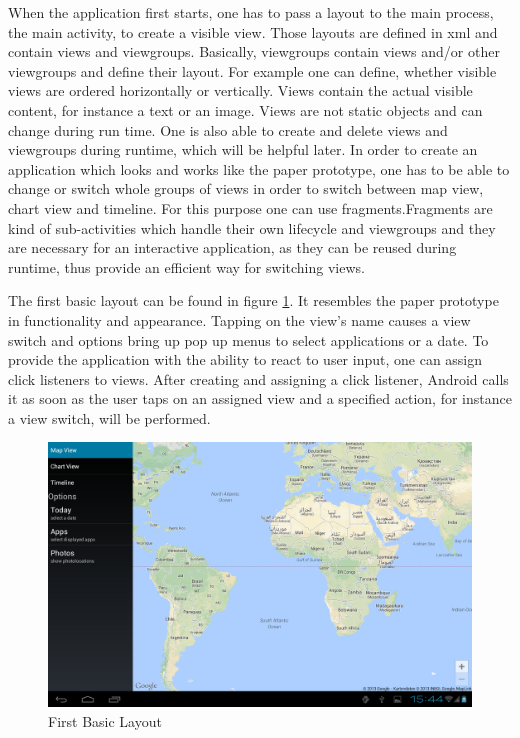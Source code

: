 When  the application first starts, one has to pass a layout to the main process, the main activity, to create a visible view. Those layouts are defined in xml and contain views and viewgroups. Basically, viewgroups contain views and/or other viewgroups and define their layout. For example one can define, whether visible views are ordered horizontally or vertically. Views contain the actual visible content, for instance a text or an image. Views are not static objects and can change during run time. One is also able to create and delete views and viewgroups during runtime, which will be helpful later. In order to create an application which looks and works like the paper prototype, one has to be able to change or switch whole groups of views in order to switch between map view, chart view and timeline. For this purpose one can use fragments.Fragments are kind of sub-activities which handle their own lifecycle and viewgroups and they are necessary for an interactive application, as they can be reused during runtime, thus provide an efficient way for switching views.

The first basic layout can be found in figure \ref{img:firstbasiclayout}. It resembles the paper prototype in functionality and appearance. Tapping on the view's name causes a view switch and options bring up pop up menus to select applications or a date.
To provide the application with the ability to react to user input, one can assign click listeners to views. After creating and assigning a click listener, Android calls it as soon as the user taps on an assigned view and a specified action, for instance a view switch, will be performed.
\begin{figure}[h]
	\caption{First Basic Layout}
	\label{img:firstbasiclayout}
	\includegraphics[width=\textwidth]{images/Screenshots/v3/Screenshot_2013-08-19-15-44-21.png}
\end{figure}

